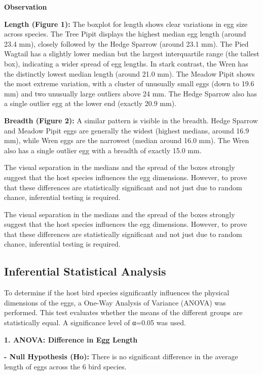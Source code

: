 \documentclass[
  letterpaper,
  DIV=11,
  numbers=noendperiod]{scrartcl}
\begin{document}
\textbf{Observation}

\textbf{Length (Figure 1):} The boxplot for length shows clear
variations in egg size across species. The Tree Pipit displays the
highest median egg length (around 23.4 mm), closely followed by the
Hedge Sparrow (around 23.1 mm). The Pied Wagtail has a slightly lower
median but the largest interquartile range (the tallest box), indicating
a wider spread of egg lengths. In stark contrast, the Wren has the
distinctly lowest median length (around 21.0 mm). The Meadow Pipit shows
the most extreme variation, with a cluster of unusually small eggs (down
to 19.6 mm) and two unusually large outliers above 24 mm. The Hedge
Sparrow also has a single outlier egg at the lower end (exactly 20.9
mm).

\textbf{Breadth (Figure 2):} A similar pattern is visible in the
breadth. Hedge Sparrow and Meadow Pipit eggs are generally the widest
(highest medians, around 16.9 mm), while Wren eggs are the narrowest
(median around 16.0 mm). The Wren also has a single outlier egg with a
breadth of exactly 15.0 mm.

The visual separation in the medians and the spread of the boxes
strongly suggest that the host species influences the egg dimensions.
However, to prove that these differences are statistically significant
and not just due to random chance, inferential testing is required.

The visual separation in the medians and the spread of the boxes
strongly suggest that the host species influences the egg dimensions.
However, to prove that these differences are statistically significant
and not just due to random chance, inferential testing is required.

\subsection{Inferential Statistical
Analysis}\label{inferential-statistical-analysis}

To determine if the host bird species significantly influences the
physical dimensions of the eggs, a One-Way Analysis of Variance (ANOVA)
was performed. This test evaluates whether the means of the different
groups are statistically equal. A significance level of α=0.05 was used.

\textbf{1. ANOVA: Difference in Egg Length}

\textbf{- Null Hypothesis (Ho):} There is no significant difference in
the average length of eggs across the 6 bird species.
\end{document}
